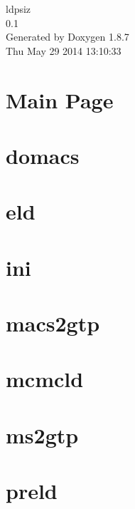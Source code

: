 \documentclass[twoside]{article}
\newcommand{\+}{\discretionary{\mbox{\scriptsize$\hookleftarrow$}}{}{}}
\begin{document}
\hypersetup{pageanchor=false,
             bookmarks=true,
             bookmarksnumbered=true,
             pdfencoding=unicode
            }
\begin{titlepage}
\vspace*{7cm}
\begin{center}%
{\Large ldpsiz \\[1ex]\large 0.\+1 }\\
\vspace*{1cm}
{\large Generated by Doxygen 1.8.7}\\
\vspace*{0.5cm}
{\small Thu May 29 2014 13:10:33}\\
\end{center}
\end{titlepage}
\tableofcontents
{}
\hypersetup{pageanchor=true}

\section{Main Page}
\label{index}\hypertarget{index}{}
\section{domacs}
\label{domacs}
\hypertarget{domacs}{}

\section{eld}
\label{eld}
\hypertarget{eld}{}

\section{ini}
\label{ini}
\hypertarget{ini}{}

\section{macs2gtp}
\label{macs2gtp}
\hypertarget{macs2gtp}{}

\section{mcmcld}
\label{mcmcld}
\hypertarget{mcmcld}{}

\section{ms2gtp}
\label{ms2gtp}
\hypertarget{ms2gtp}{}

\section{preld}
\label{preld}
\hypertarget{preld}{}

\end{document}
